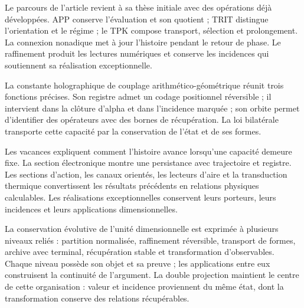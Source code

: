 
Le parcours de l'article revient à sa thèse initiale avec des opérations déjà développées. APP conserve l'évaluation et son quotient ; TRIT distingue l'orientation et le régime ; le TPK compose transport, sélection et prolongement. La connexion nonadique met à jour l'histoire pendant le retour de phase. Le raffinement produit les lectures numériques et conserve les incidences qui soutiennent sa réalisation exceptionnelle.

La constante holographique de couplage arithmético-géométrique
réunit trois fonctions précises. Son registre admet un codage
positionnel réversible ; il intervient dans la clôture d’alpha et dans
l’incidence marquée ; son orbite permet d’identifier des opérateurs
avec des bornes de récupération. La loi bilatérale transporte cette
capacité par la conservation de l’état et de ses formes.

Les vacances expliquent comment l’histoire avance lorsqu’une
capacité demeure fixe. La section électronique montre une
persistance avec trajectoire et registre. Les sections d’action,
les canaux orientés, les lecteurs d’aire et la transduction
thermique convertissent les résultats précédents en relations
physiques calculables. Les réalisations exceptionnelles conservent
leurs porteurs, leurs incidences et leurs applications dimensionnelles.

La conservation évolutive de l'unité dimensionnelle est exprimée à plusieurs niveaux reliés : partition normalisée, raffinement réversible, transport de formes, archive avec terminal, récupération stable et transformation d'observables. Chaque niveau possède son objet et sa preuve ; les applications entre eux construisent la continuité de l'argument. La double projection maintient le centre de cette organisation : valeur et incidence proviennent du même état, dont la transformation conserve des relations récupérables.


